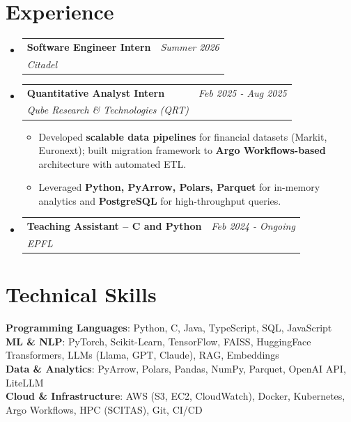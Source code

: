 \documentclass[a4paper,11pt]{article}
\makeatletter
\newcommand{\resumeSubheading}[4]{
  \vspace{0.5mm}
\item
  \begin{tabular*}{0.98\textwidth}[t]{l@{\extracolsep{\fill}}r}
    \textbf{#1} & \textit{\footnotesize{#4}} \\
    \textit{\footnotesize{#3}} &  \footnotesize{#2}\\
  \end{tabular*}
  \vspace{-2.4mm}
}
\newcommand{\resumeSubHeadingListStart}{
\begin{itemize}[leftmargin=*,labelsep=0mm]}
\newcommand{\resumeItemListStart}{
          \begin{justify}
            \begin{itemize}[leftmargin=3ex, rightmargin=2ex,
              noitemsep,labelsep=1.2mm,itemsep=0mm]\small}
\newcommand{\resumeSubHeadingListEnd}{
          \end{itemize}\vspace{2mm}}
\newcommand{\resumeItemListEnd}{
    \end{itemize}
\end{justify}\vspace{-2mm}}
\makeatother
\begin{document}
\section{\textbf{Experience}}
\resumeSubHeadingListStart
\vspace{-2.0mm}
\resumeSubheading
{Software Engineer Intern}{}
{Citadel}{Summer 2026}
\vspace{-2mm}

\resumeSubheading
{Quantitative Analyst Intern}{}
{Qube Research \& Technologies (QRT)}{Feb 2025 - Aug 2025}
\vspace{-2mm}
\resumeItemListStart
\item Developed \textbf{scalable data pipelines} for financial datasets
(Markit, Euronext); built migration framework to \textbf{Argo
Workflows-based} architecture with automated ETL.
\item Leveraged \textbf{Python, PyArrow, Polars, Parquet} for
in-memory analytics and \textbf{PostgreSQL} for high-throughput queries.
\resumeItemListEnd
\vspace{-3.0mm}

\resumeSubheading
{Teaching Assistant -- C and Python}{}
{EPFL}{Feb 2024 - Ongoing}
\vspace{-2.0mm}

\resumeSubHeadingListEnd
\vspace{-5.5mm}

\section{\textbf{Technical Skills}}
\begin{itemize}[leftmargin=0.05in, label={}]
    \small{
    \item{
        \textbf{Programming Languages}{: Python, C, Java, TypeScript,
        SQL, JavaScript} \\
        \textbf{ML \& NLP}{: PyTorch, Scikit-Learn, TensorFlow, FAISS,
          HuggingFace Transformers, LLMs (Llama, GPT, Claude),
        RAG, Embeddings} \\
        \textbf{Data \& Analytics}{: PyArrow, Polars, Pandas, NumPy,
        Parquet, OpenAI API, LiteLLM} \\
        \textbf{Cloud \& Infrastructure}{: AWS (S3, EC2, CloudWatch),
        Docker, Kubernetes, Argo Workflows, HPC (SCITAS), Git, CI/CD}
      }
    }
\end{itemize}
\vspace{-10pt}
\end{document}
